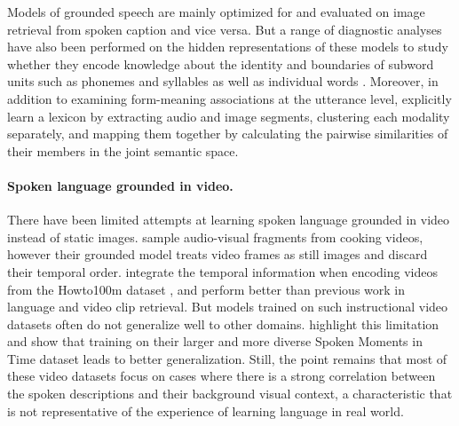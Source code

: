 Models of grounded speech are mainly optimized for and evaluated on image retrieval from spoken caption and vice versa. But a range of diagnostic analyses have also been performed on the hidden representations of these models to study whether they encode knowledge about the identity and boundaries of subword units such as phonemes and syllables \cite{alishahi-etal-2017-encoding, harwath2019towards, khorrami_2021} as well as individual words \cite{chrupala-etal-2017-representations,havard2019word}. Moreover, in addition to examining form-meaning associations at the utterance level, \cite{harwath2017learning} explicitly learn a lexicon by extracting audio and image segments, clustering each modality separately, and mapping them together by calculating the pairwise similarities of their members in the joint semantic space.

\paragraph{Spoken language grounded in video.}
There have been limited attempts at learning spoken language grounded in video instead of static images. 
\citet{boggust2019grounding} sample audio-visual fragments from cooking videos, however their grounded model treats video frames as still images and discard their temporal order.
\citet{rouditchenko2020avlnet} integrate the temporal information when encoding videos from the Howto100m dataset \cite{miech2019howto100m}, and perform better than previous work in language and video clip retrieval. 
But models trained on such instructional video datasets often do not generalize well to other domains. \citet{monfort2021spokenmoments} highlight this limitation and show that training on their larger and more diverse Spoken Moments in Time dataset leads to better generalization.
Still, the point remains that most of these video datasets focus on cases where there is a strong correlation between the spoken descriptions and their background visual context, a characteristic that is not representative of the experience of learning language in real world.

